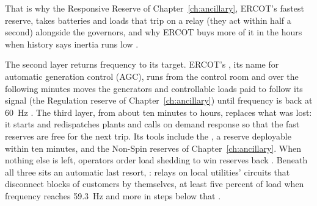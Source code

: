 That is why the Responsive Reserve of Chapter~\ref{ch:ancillary}, ERCOT's fastest reserve, takes batteries and loads that trip on a relay (they act within half a second) alongside the governors, and why ERCOT buys more of it in the hours when history says inertia runs low \autocite{ercot2024asstudy}. %

The second layer returns frequency to its target. ERCOT's , its name for automatic generation control (AGC), runs from the control room and over the following minutes moves the generators and controllable loads paid to follow its signal (the Regulation reserve of Chapter~\ref{ch:ancillary}) until frequency is back at 60~Hz \autocite{NERCBalancingFrequency2021,FERCNERCFeb2021,potomac2026somercot}. %
The third layer, from about ten minutes to hours, replaces what was lost: it starts and redispatches plants and calls on demand response so that the fast reserves are free for the next trip. Its tools include the , a reserve deployable within ten minutes, and the Non-Spin reserves of Chapter~\ref{ch:ancillary}. When nothing else is left, operators order load shedding to win reserves back \autocite{FERCNERCFeb2021,NERCBalancingFrequency2021}. %
Beneath all three sits an automatic last resort, : relays on local utilities' circuits that disconnect blocks of customers by themselves, at least five percent of load when frequency reaches 59.3~Hz and more in steps below that \autocite{FERCNERCFeb2021}. %

